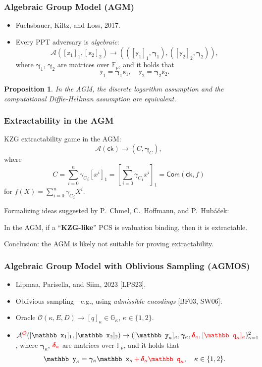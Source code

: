 \documentclass[9pt]{beamer}
\newcommand{\red}[1]{\textcolor{red!}{#1}}
\newcommand{\F}{\mathbb{F}}
\newcommand{\G}{\mathbb{G}}
\newcommand{\Com}{\mathsf{Com}}
\newcommand{\ck}{\mathsf{ck}}  %
\newcommand{\A}{\mathcal A}  %
\newcommand{\Oracle}{\mathcal{O}}  %
\newtheorem{proposition}{Proposition}
\begin{document}
\begin{frame}
\frametitle{Algebraic Group Model (AGM)}
\begin{itemize}
    \item Fuchsbauer, Kiltz, and Loss, 2017.
    \item Every PPT adversary is \textit{algebraic}:
    $$
    \A([\mathbb x_1]_1, [\mathbb x_2]_2) \to (([\mathbb y_1]_1, \bm \gamma_1), ([\mathbb y_2]_2, \bm \gamma_2)),
    $$
    where $ \bm{\gamma}_1 $, $ \bm{\gamma}_2 $ are matrices over $ \F_p $, and it holds that 
    \begin{equation*}
    \mathbb y_1 = \bm{\gamma}_1 \mathbb x_1, \quad 
    \mathbb y_2 = \bm{\gamma}_2 \mathbb x_2. 
    \end{equation*}
\end{itemize}
\begin{proposition}
    In the AGM, the discrete logarithm assumption and the computational Diffie-Hellman assumption are equivalent.
\end{proposition}
\end{frame}


\begin{frame}
\frametitle{Extractability in the AGM}
KZG extractability game in the AGM:
\[
\A(\ck) \to (C, \bm \gamma_C),
\]
where 
\[
C = \sum_{i=0}^n {\gamma_C}_i [x^i]_1 = 
\left[ \sum_{i=0}^n {\gamma_C}_i x^i \right]_1 = 
\Com(\ck, f)
\]
for $ f(X) = \sum_{i=0}^n {\gamma_C}_i X^i $.

Formalizing ideas suggested by P.\ Chmel, C.\ Hoffmann, and P.\ Hubáček:
\begin{theorem}[informal]
In the AGM, if a ``\textbf{KZG-like}'' PCS is evaluation binding, then it is extractable.
\end{theorem}
Conclusion: the AGM is likely not suitable for proving extractability. 
\end{frame}


\begin{frame}
\frametitle{Algebraic Group Model with Oblivious Sampling (AGMOS)}
\begin{itemize}
    \item Lipmaa, Parisella, and Siim, 2023 [LPS23].
    \item Oblivious sampling---e.g., using \emph{admissible encodings} [BF03, SW06].
    \item Oracle $ \Oracle(\kappa, E, D) \to [q]_\kappa \in \G_\kappa $, $ \kappa \in \{ 1, 2 \} $.
    \item \(
    \A^{\red{\Oracle}}([\mathbb x_1]_1, [\mathbb x_2]_2) \to
    ([\mathbb y_\kappa]_\kappa, \bm \gamma_\kappa, \red{\bm \delta_\kappa}, \red{[\mathbb q_\kappa]_\kappa})_{\kappa=1}^2
    \), where $ \bm{\gamma}_\kappa $, $ \red{\bm{\delta}_\kappa} $ are matrices over $ \F_p $, and it holds that 
    \begin{equation*}
    \mathbb y_\kappa = \bm{\gamma}_\kappa \mathbb x_\kappa \red{\,+\, \bm \delta_\kappa \mathbb q_\kappa}, \quad 
    \kappa \in \{ 1, 2 \}.
    \end{equation*}
\end{itemize}   
\end{frame}
\end{document}
